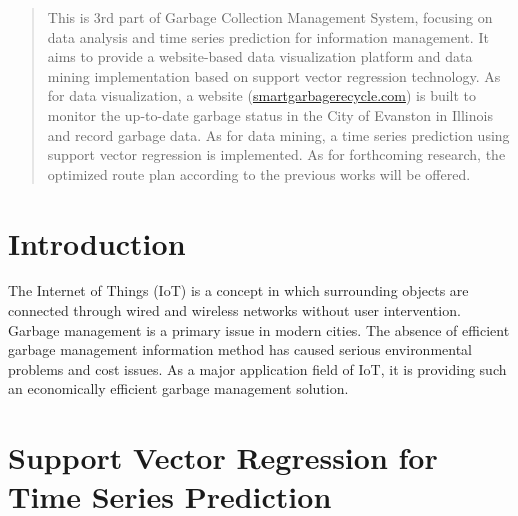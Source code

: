 \documentclass[a0,portrait]{a0poster}
\begin{document}
\begin{multicols}{3} %


\color{Navy} %

\begin{abstract}
\noindent{}This is 3rd part of Garbage Collection Management System, focusing on data analysis and time series prediction for information management. It aims to provide a website-based data visualization platform and data mining implementation based on support vector regression technology. As for data visualization, a website (\href{http://smartgarbagerecycle.com/}{smartgarbagerecycle.com}) is built to monitor the up-to-date garbage status in the City of Evanston in Illinois and record garbage data. As for data mining, a time series prediction using support vector regression is implemented. As for forthcoming research, the optimized route plan according to the previous works will be offered. 
\end{abstract}

\color{Black} %

\section*{Introduction}
The Internet of Things (IoT) is a concept in which surrounding objects are connected through wired and wireless networks without user intervention. 
Garbage management is a primary issue in modern cities. The absence of efficient garbage management information method has caused serious environmental problems and cost issues. As a major application field of IoT, it is providing such an economically efficient garbage management solution.

\color{Black} %
\section*{Support Vector Regression for Time Series Prediction}

\end{multicols}
\end{document}
